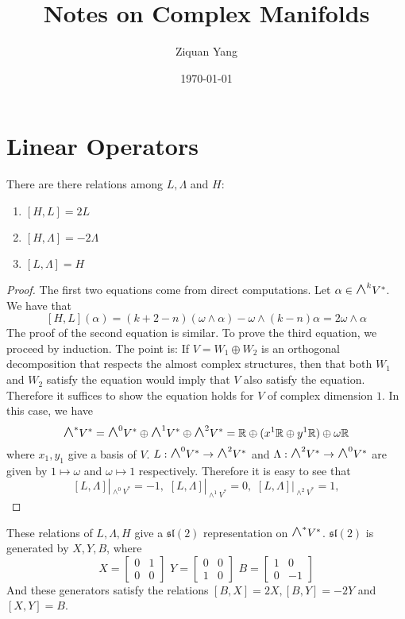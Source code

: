 \documentclass[12pt]{article}
\theoremstyle{plain}
\theoremstyle{definition}
\newcommand{\IR}{\mathbb{R}}
\newcommand{\<}{\langle}
\renewcommand{\>}{\rangle}
\newcommand{\w}{\omega}
\newcommand{\bwedge}{\mbox{\Large $\wedge$}}
\newcommand{\spl}{\mathfrak{sl}}
\begin{document}
\title{Notes on Complex Manifolds}
\author{Ziquan Yang}
\date{\today}
\maketitle

\section{Linear Operators}


There are there relations among $L, \Lambda$ and $H$: 
\begin{enumerate}
\item $[H, L] = 2L$
\item $[H, \Lambda] = - 2 \Lambda$
\item $[L, \Lambda] = H$
\end{enumerate}
\begin{proof}
The first two equations come from direct computations. Let $\alpha \in \bwedge^k V^*$. We have that 
$$ [H, L](\alpha) = (k + 2 - n)(\w \wedge \alpha) - \w \wedge (k - n) \alpha = 2 \w \wedge \alpha$$
The proof of the second equation is similar. To prove the third equation, we proceed by induction. The point is: If $V = W_1 \oplus W_2$ is an orthogonal decomposition that respects the almost complex structures, then that both $W_1$ and $W_2$ satisfy the equation would imply that $V$ also satisfy the equation. Therefore it suffices to show the equation holds for $V$ of complex dimension $1$. In this case, we have 
$$ \bwedge^* V^* = \bwedge^0 V^* \oplus \bwedge^1 V^* \oplus \bwedge^2 V^* = \IR \oplus (x^1 \IR \oplus y^1 \IR) \oplus \w \IR $$
where $x_1, y_1$ give a basis of $V$. $L : \bwedge^0 V^* \to \bwedge^2 V^*$ and $\Lambda : \bwedge^2 V^* \to \bwedge^0 V^*$ are given by $1 \mapsto \w$ and $\w \mapsto 1$ respectively. Therefore it is easy to see that 
$$ [L, \Lambda]|_{\wedge^0 V^*} = -1, \, \, [L, \Lambda]|_{\wedge^1 V^*} = 0, \, \, [L, \Lambda]|_{\wedge^2 V^*} = 1, $$
\end{proof}

These relations of $L, \Lambda, H$ give a $\spl(2)$ representation on $\bwedge^* V^*$. $\spl(2)$ is generated by $X, Y, B$, where 
$$ X = \begin{bmatrix}
0 & 1 \\ 0 & 0 
\end{bmatrix} \, \, Y = \begin{bmatrix}
0 & 0 \\ 1 & 0
\end{bmatrix} \, \, B = \begin{bmatrix}
1 & 0 \\ 0 & -1 
\end{bmatrix}$$
And these generators satisfy the relations $[B, X] = 2X, [B, Y] = -2 Y$ and $ [X, Y] = B$. 
\end{document}
